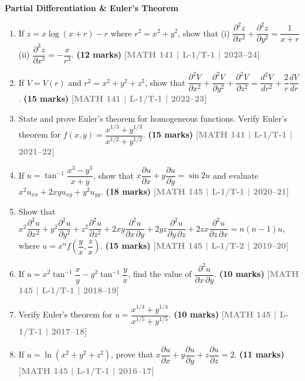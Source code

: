 \documentclass[12pt,a4paper]{article}
\newcommand{\yr}[1]{\hfill\textcolor{gray}{\small\textbf{[#1]}}}
\newcommand{\mk}[1]{\textcolor{orange!70!black}{\small\textbf{(#1 marks)}}}
\newcommand{\subtopic}[2]{%
  \vspace{10pt}
  \noindent\begin{tcolorbox}[colback=#1!8,colframe=#1,boxrule=0.6pt,arc=4pt,
    left=6pt,right=6pt,top=4pt,bottom=4pt]
    \small\bfseries\textcolor{#1}{#2}
  \end{tcolorbox}
  \vspace{2pt}
}
\begin{document}
\subtopic{cA}{Partial Differentiation \& Euler's Theorem}
\label{sub:s1-partial}

\begin{enumerate}\item If $z=x\log(x+r)-r$ where $r^{2}=x^{2}+y^{2}$, show that (i) $\dfrac{\partial^{2}z}{\partial x^{2}}+\dfrac{\partial^{2}z}{\partial y^{2}}=\dfrac{1}{x+r}$ \quad (ii) $\dfrac{\partial^{3}z}{\partial x^{3}}=-\dfrac{x}{r^{3}}$.
\mk{12} \yr{MATH 141 | L-1/T-1 | 2023--24}

\item If $V=V(r)$ and $r^{2}=x^{2}+y^{2}+z^{2}$, show that $\dfrac{\partial^{2}V}{\partial x^{2}}+\dfrac{\partial^{2}V}{\partial y^{2}}+\dfrac{\partial^{2}V}{\partial z^{2}}=\dfrac{d^{2}V}{dr^{2}}+\dfrac{2}{r}\dfrac{dV}{dr}$.
\mk{15} \yr{MATH 141 | L-1/T-1 | 2022--23}



\item State and prove Euler's theorem for homogeneous functions. Verify Euler's theorem for $f(x,y)=\dfrac{x^{1/3}+y^{1/3}}{x^{1/2}+y^{1/2}}$.
\mk{15} \yr{MATH 141 | L-1/T-1 | 2021--22}

\item If $u=\tan^{-1}\!\dfrac{x^{3}-y^{3}}{x+y}$, show that $x\dfrac{\partial u}{\partial x}+y\dfrac{\partial u}{\partial y}=\sin 2u$ and evaluate $x^{2}u_{xx}+2xyu_{xy}+y^{2}u_{yy}$.
\mk{18} \yr{MATH 145 | L-1/T-1 | 2020--21}

\item Show that $x^{2}\dfrac{\partial^{2}u}{\partial x^{2}}+y^{2}\dfrac{\partial^{2}u}{\partial y^{2}}+z^{2}\dfrac{\partial^{2}u}{\partial z^{2}}+2xy\dfrac{\partial^{2}u}{\partial x\,\partial y}+2yz\dfrac{\partial^{2}u}{\partial y\,\partial z}+2zx\dfrac{\partial^{2}u}{\partial z\,\partial x}=n(n-1)u$, where $u=x^{n}f\!\left(\dfrac{y}{x},\dfrac{z}{x}\right)$.
\mk{15} \yr{MATH 145 | L-1/T-2 | 2019--20}

\item If $u=x^{2}\tan^{-1}\!\dfrac{x}{y}-y^{2}\tan^{-1}\!\dfrac{y}{x}$, find the value of $\dfrac{\partial^{2}u}{\partial x\,\partial y}$.
\mk{10} \yr{MATH 145 | L-1/T-1 | 2018--19}

\item Verify Euler's theorem for $u=\dfrac{x^{1/4}+y^{1/4}}{x^{1/5}+y^{1/5}}$.
\mk{10} \yr{MATH 145 | L-1/T-1 | 2017--18}

\item If $u=\ln(x^{2}+y^{2}+z^{2})$, prove that $x\dfrac{\partial u}{\partial x}+y\dfrac{\partial u}{\partial y}+z\dfrac{\partial u}{\partial z}=2$.
\mk{11} \yr{MATH 145 | L-1/T-1 | 2016--17}


\end{enumerate}
\end{document}
